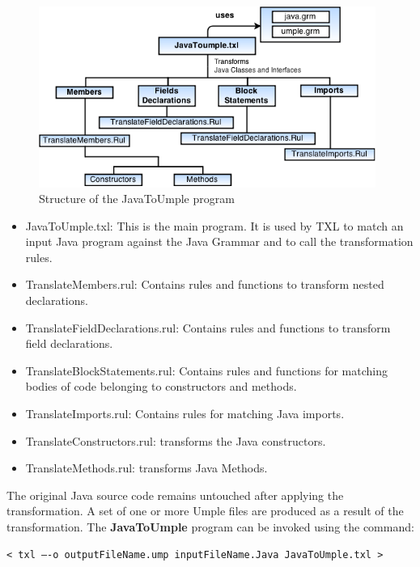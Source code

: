 \begin{figure}[h]
\centering
\includegraphics[width=0.98\textwidth]{Figures/TXL_STRUCTURE.png} 
\caption{Structure of the JavaToUmple program}
\label{fig:txlStructure}
\end{figure}

\begin{itemize}
\item JavaToUmple.txl: This is the main program. It is used by TXL to match an input Java program against the Java Grammar and to call the transformation rules.
\item TranslateMembers.rul: Contains rules and functions to transform nested declarations.
\item TranslateFieldDeclarations.rul: Contains rules and functions to transform field declarations.
\item  TranslateBlockStatements.rul: Contains rules and functions for matching bodies of code belonging to constructors and methods.
\item TranslateImports.rul: Contains rules for matching Java imports.
\item TranslateConstructors.rul: transforms the Java constructors.
\item TranslateMethods.rul: transforms Java Methods.
\end{itemize}

The original Java source code remains untouched after applying the transformation. A set of one or more Umple files are produced as a result of the transformation. The \textbf{JavaToUmple} program can be invoked using the command:

\vspace{\baselineskip}
\begin{lstlisting}[style=umplePlain]
< txl –-o outputFileName.ump inputFileName.Java JavaToUmple.txl >
\end{lstlisting}

